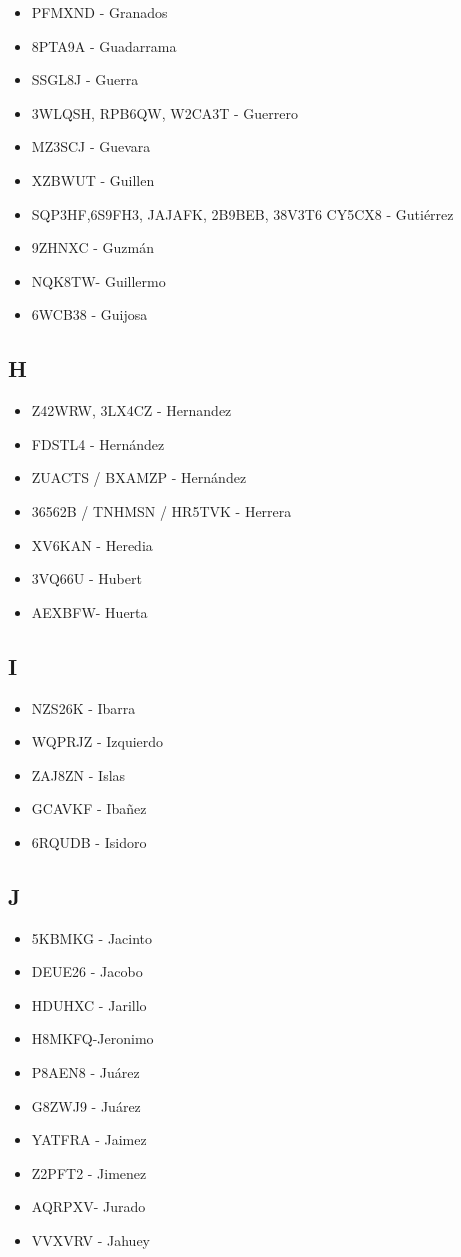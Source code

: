 \begin{itemize}[leftmargin=*,nosep]
\item PFMXND  -  Granados
\item 8PTA9A  -  Guadarrama
\item SSGL8J  -  Guerra
\item 3WLQSH, RPB6QW, W2CA3T  -  Guerrero
\item MZ3SCJ - Guevara
\item XZBWUT  -  Guillen
\item SQP3HF,6S9FH3, JAJAFK, 2B9BEB, 38V3T6  CY5CX8 -  Gutiérrez
\item 9ZHNXC - Guzmán
\item NQK8TW- Guillermo
\item 6WCB38 - Guijosa
\end{itemize}

\subsection*{H}
\begin{itemize}[leftmargin=*,nosep]
\item Z42WRW, 3LX4CZ  -  Hernandez
\item FDSTL4 - Hernández
\item ZUACTS / BXAMZP -  Hernández
\item 36562B / TNHMSN / HR5TVK - Herrera
\item XV6KAN - Heredia
\item 3VQ66U - Hubert
\item AEXBFW- Huerta
\end{itemize}

\subsection*{I}
\begin{itemize}[leftmargin=*,nosep]
\item NZS26K  -  Ibarra
\item WQPRJZ - Izquierdo
\item ZAJ8ZN - Islas
\item GCAVKF - Ibañez
\item 6RQUDB - Isidoro
\end{itemize}

\subsection*{J}
\begin{itemize}[leftmargin=*,nosep]
\item 5KBMKG  -  Jacinto
\item DEUE26 - Jacobo
\item HDUHXC - Jarillo
\item H8MKFQ-Jeronimo
\item P8AEN8 - Juárez
\item G8ZWJ9 - Juárez
\item YATFRA - Jaimez
\item Z2PFT2 -  Jimenez
\item AQRPXV- Jurado
\item VVXVRV - Jahuey
\end{itemize}

